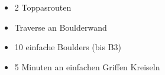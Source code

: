 \begin{itemize}
    \item 2 Toppasrouten
    \item Traverse an Boulderwand
    \item 10 einfache Boulders (bis B3)
    \item 5 Minuten an einfachen Griffen Kreiseln
\end{itemize}